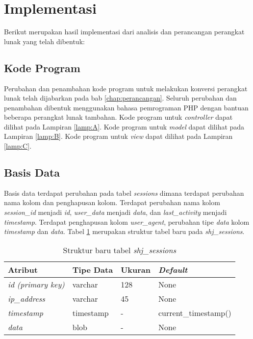 \section{Implementasi}
Berikut merupakan hasil implementasi dari analisis dan perancangan perangkat lunak yang telah dibentuk:
\subsection{Kode Program}
Perubahan dan penambahan kode program untuk melakukan konversi perangkat lunak telah dijabarkan pada bab \ref{chap:perancangan}. Seluruh perubahan dan penambahan dibentuk menggunakan bahasa pemrograman PHP dengan bantuan beberapa perangkat lunak tambahan. Kode program untuk \textit{controller} dapat dilihat pada Lampiran \ref{lamp:A}. Kode program untuk \textit{model} dapat dilihat pada Lampiran \ref{lamp:B}. Kode program untuk \textit{view} dapat dilihat pada Lampiran \ref{lamp:C}.

\subsection{Basis Data}
Basis data terdapat perubahan pada tabel \textit{sessions} dimana terdapat perubahan nama kolom dan penghapusan kolom. Terdapat perubahan nama kolom \textit{session\_id} menjadi \textit{id}, \textit{user\_data} menjadi \textit{data}, dan \textit{last\_activity} menjadi \textit{timestamp}. Terdapat penghapusan kolom \textit{user\_agent}, perubahan tipe \textit{data} kolom \textit{timestamp} dan \textit{data}. Tabel \ref{tab:shjsessionbab5} merupakan struktur tabel baru pada \textit{shj\_sessions}.

\begin{table}[H]
\centering
\caption{Struktur baru tabel \textit{shj\_sessions}}
\label{tab:shjsessionbab5}
\begin{tabular}{|l|l|l|l|}
\hline
\textbf{Atribut}          & \textbf{Tipe Data} & \textbf{Ukuran} & \textit{\textbf{Default}} \\ \hline
\textit{id (primary key)} & varchar            & 128             & None                      \\ \hline
\textit{ip\_address}       & varchar            & 45              & None                      \\ \hline
\textit{timestamp}        & timestamp          & -               & current\_timestamp()       \\ \hline
\textit{data}             & blob               & -               & None                      \\ \hline
\end{tabular}
\end{table}

